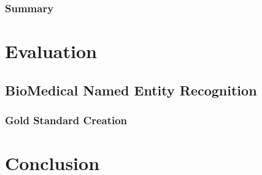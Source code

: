 \documentclass[11pt,titlepage,oneside,openany]{book}
\begin{document}
\subsection{Summary}

\chapter{Evaluation}
\label{cha:evaluation}

\section{BioMedical Named Entity Recognition}
\subsection{Gold Standard Creation}

\chapter{Conclusion}
\label{cha:conclusion}




\appendix

\newpage

\end{document}

